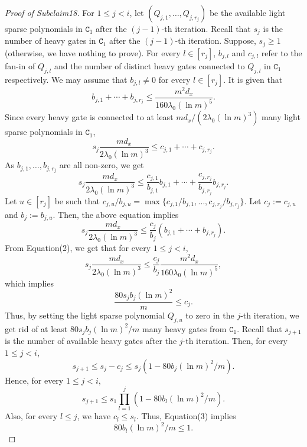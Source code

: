 \documentclass[10pt,a4paper]{article}
\begin{document}
\begin{proof}[Proof of Subclaim18]
For $1\le j<i$, let $(Q_{j,1},\ldots,Q_{j,r_j})$ be the available light sparse polynomials in $\mathtt C_1$ after the $(j-1)$-th iteration. Recall that $s_j$ is the number of heavy gates in $\mathtt C_1$ after the $(j-1)$-th iteration. Suppose, $s_j\ge1$ (otherwise, we have nothing to prove). For every $l\in[r_j]$, $b_{j,l}$ and $c_{j,l}$ refer to the fan-in of $Q_{j,l}$ and the number of distinct heavy gates connected to $Q_{j,l}$ in $\mathtt C_1$ respectively. We may assume that $b_{j,l}\ne0$ for every $l\in[r_j]$. It is given that
\begin{equation}
b_{j,1}+\cdots+b_{j,r_j}\le\frac{m^2d_x}{160\lambda_0(\ln m)^5}.\tag{2}
\end{equation}
Since every heavy gate is connected to at least $md_x/(2\lambda_0(\ln m)^3)$ many light sparse polynomials in $\mathtt C_1$,
\[
s_j\frac{md_x}{2\lambda_0(\ln m)^3}\le c_{j,1}+\cdots+c_{j,r_j}.
\]
As $b_{j,1},\ldots,b_{j,r_j}$ are all non-zero, we get
\[
s_j\frac{md_x}{2\lambda_0(\ln m)^3}
\le\frac{c_{j,1}}{b_{j,1}}b_{j,1}+\cdots+\frac{c_{j,r_j}}{b_{j,r_j}}b_{j,r_j}.
\]
Let $u\in[r_j]$ be such that $c_{j,u}/b_{j,u}=\max\{c_{j,1}/b_{j,1},\ldots,c_{j,r_j}/b_{j,r_j}\}$. Let $c_j:=c_{j,u}$ and $b_j:=b_{j,u}$. Then, the above equation implies
\[
s_j\frac{md_x}{2\lambda_0(\ln m)^3}\le\frac{c_j}{b_j}(b_{j,1}+\cdots+b_{j,r_j}).
\]
From Equation(2), we get that for every $1\le j<i$,
\[
s_j\frac{md_x}{2\lambda_0(\ln m)^3}
\le\frac{c_j}{b_j}\frac{m^2d_x}{160\lambda_0(\ln m)^5},
\]
which implies
\begin{equation}
\frac{80s_jb_j(\ln m)^2}{m}\le c_j.\tag{3}
\end{equation}
Thus, by setting the light sparse polynomial $Q_{j,u}$ to zero in the $j$-th iteration, we get rid of at least $80s_jb_j(\ln m)^2/m$ many heavy gates from $\mathtt C_1$. Recall that $s_{j+1}$ is the number of available heavy gates after the $j$-th iteration. Then, for every $1\le j<i$,
\begin{equation}
s_{j+1}\le s_j-c_j\le s_j(1-80b_j(\ln m)^2/m).\tag{4}
\end{equation}
Hence, for every $1\le j<i$,
\begin{equation}
s_{j+1}\le s_1\prod_{l=1}^j(1-80b_l(\ln m)^2/m).\tag{5}
\end{equation}
Also, for every $l\le j$, we have $c_l\le s_l$. Thus, Equation(3) implies
\begin{equation}
80b_l(\ln m)^2/m\le1.\tag{6}
\end{equation}

\end{proof}
\end{document}
